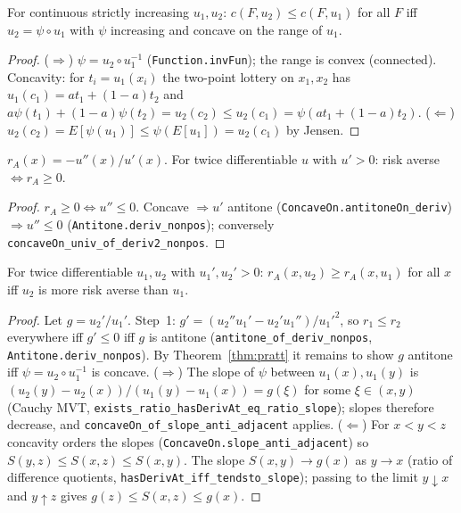 \begin{theorem}
\label{thm:pratt}
\leanok
{}
For continuous strictly increasing $u_1,u_2$: $c(F,u_2) \le c(F,u_1)$ for all $F$ iff $u_2 = \psi\circ u_1$
with $\psi$ increasing and concave on the range of $u_1$.
\end{theorem}
\begin{proof}
\leanok
($\Rightarrow$) $\psi = u_2 \circ u_1^{-1}$ (\texttt{Function.invFun}); the range is convex
(connected). Concavity: for $t_i = u_1(x_i)$ the two-point lottery on $x_1, x_2$ has
$u_1(c_1) = a t_1 + (1-a)t_2$ and $a\psi(t_1) + (1-a)\psi(t_2) = u_2(c_2) \le u_2(c_1) = \psi(a t_1 + (1-a) t_2)$.
($\Leftarrow$) $u_2(c_2) = E[\psi(u_1)] \le \psi(E[u_1]) = u_2(c_1)$ by Jensen.
\end{proof}

\begin{theorem}
\label{thm:arrow-pratt}
\leanok
{}
$r_A(x) = -u''(x)/u'(x)$. For twice differentiable $u$ with $u' > 0$: risk averse $\iff r_A \ge 0$.
\end{theorem}
\begin{proof}
\leanok
$r_A \ge 0 \iff u'' \le 0$. Concave $\Rightarrow u'$ antitone (\texttt{ConcaveOn.antitoneOn\_deriv})
$\Rightarrow u'' \le 0$ (\texttt{Antitone.deriv\_nonpos}); conversely
\texttt{concaveOn\_univ\_of\_deriv2\_nonpos}.
\end{proof}

\begin{theorem}
\label{thm:pratt-arrow}
\leanok
{}
For twice differentiable $u_1,u_2$ with $u_1', u_2' > 0$: $r_A(x,u_2) \ge r_A(x,u_1)$ for all $x$ iff
$u_2$ is more risk averse than $u_1$.
\end{theorem}
\begin{proof}
\leanok
Let $g = u_2'/u_1'$. Step~1: $g' = (u_2''u_1' - u_2'u_1'')/u_1'^2$, so $r_1 \le r_2$ everywhere iff
$g' \le 0$ iff $g$ is antitone (\texttt{antitone\_of\_deriv\_nonpos}, \texttt{Antitone.deriv\_nonpos}).
By Theorem~\ref{thm:pratt} it remains to show $g$ antitone iff $\psi = u_2\circ u_1^{-1}$ is concave.
($\Rightarrow$) The slope of $\psi$ between $u_1(x), u_1(y)$ is $(u_2(y)-u_2(x))/(u_1(y)-u_1(x)) =
g(\xi)$ for some $\xi\in(x,y)$ (Cauchy MVT, \texttt{exists\_ratio\_hasDerivAt\_eq\_ratio\_slope}); slopes
therefore decrease, and \texttt{concaveOn\_of\_slope\_anti\_adjacent} applies. ($\Leftarrow$) For
$x < y < z$ concavity orders the slopes (\texttt{ConcaveOn.slope\_anti\_adjacent}) so
$S(y,z) \le S(x,z) \le S(x,y)$. The slope $S(x,y) \to g(x)$ as $y \to x$ (ratio of difference
quotients, \texttt{hasDerivAt\_iff\_tendsto\_slope}); passing to the limit $y \downarrow x$ and
$y \uparrow z$ gives $g(z) \le S(x,z) \le g(x)$.
\end{proof}

